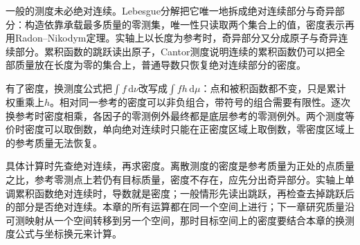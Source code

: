 一般的测度未必绝对连续。Lebesgue分解把它唯一地拆成绝对连续部分与奇异部分：构造依靠承载最多质量的零测集，唯一性只读取两个集合上的值，密度表示再用Radon–Nikodym定理。实轴上以长度为参考时，奇异部分又分成原子与奇异连续部分。累积函数的跳跃读出原子，Cantor测度说明连续的累积函数仍可以把全部质量放在长度为零的集合上，普通导数只恢复绝对连续部分的密度。

有了密度，换测度公式把$\int f\,\mathrm d\nu$改写成$\int fh\,\mathrm d\mu$：点和被积函数都不变，只是累计权重乘上$h$。相对同一参考的密度可以非负组合，带符号的组合需要有限性。逐次换参考时密度相乘，各因子的零测例外最终都是底层参考的零测例外。两个测度等价时密度可以取倒数，单向绝对连续时只能在正密度区域上取倒数，零密度区域上的参考质量无法恢复。

具体计算时先查绝对连续，再求密度。离散测度的密度是参考质量为正处的点质量之比，参考零测点上若仍有目标质量，密度不存在，应先分出奇异部分。实轴上单调累积函数绝对连续时，导数就是密度；一般情形先读出跳跃，再检查去掉跳跃后的部分是否绝对连续。本章的所有运算都在同一个空间上进行；下一章研究质量沿可测映射从一个空间转移到另一个空间，那时目标空间上的密度要结合本章的换测度公式与坐标换元来计算。
